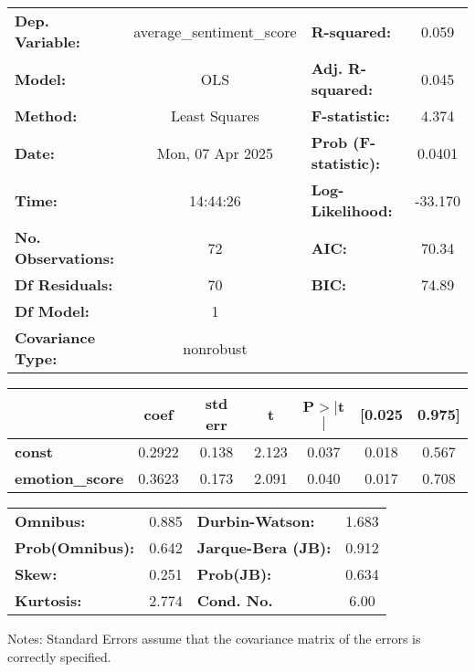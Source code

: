 \begin{center}
\begin{tabular}{lclc}
\toprule
\textbf{Dep. Variable:}    & average\_sentiment\_score & \textbf{  R-squared:         } &     0.059   \\
\textbf{Model:}            &            OLS            & \textbf{  Adj. R-squared:    } &     0.045   \\
\textbf{Method:}           &       Least Squares       & \textbf{  F-statistic:       } &     4.374   \\
\textbf{Date:}             &      Mon, 07 Apr 2025     & \textbf{  Prob (F-statistic):} &   0.0401    \\
\textbf{Time:}             &          14:44:26         & \textbf{  Log-Likelihood:    } &   -33.170   \\
\textbf{No. Observations:} &               72          & \textbf{  AIC:               } &     70.34   \\
\textbf{Df Residuals:}     &               70          & \textbf{  BIC:               } &     74.89   \\
\textbf{Df Model:}         &                1          & \textbf{                     } &             \\
\textbf{Covariance Type:}  &         nonrobust         & \textbf{                     } &             \\
\bottomrule
\end{tabular}
\begin{tabular}{lcccccc}
                        & \textbf{coef} & \textbf{std err} & \textbf{t} & \textbf{P$> |$t$|$} & \textbf{[0.025} & \textbf{0.975]}  \\
\midrule
\textbf{const}          &       0.2922  &        0.138     &     2.123  &         0.037        &        0.018    &        0.567     \\
\textbf{emotion\_score} &       0.3623  &        0.173     &     2.091  &         0.040        &        0.017    &        0.708     \\
\bottomrule
\end{tabular}
\begin{tabular}{lclc}
\textbf{Omnibus:}       &  0.885 & \textbf{  Durbin-Watson:     } &    1.683  \\
\textbf{Prob(Omnibus):} &  0.642 & \textbf{  Jarque-Bera (JB):  } &    0.912  \\
\textbf{Skew:}          &  0.251 & \textbf{  Prob(JB):          } &    0.634  \\
\textbf{Kurtosis:}      &  2.774 & \textbf{  Cond. No.          } &     6.00  \\
\bottomrule
\end{tabular}
\end{center}

Notes: \newline
 [1] Standard Errors assume that the covariance matrix of the errors is correctly specified.